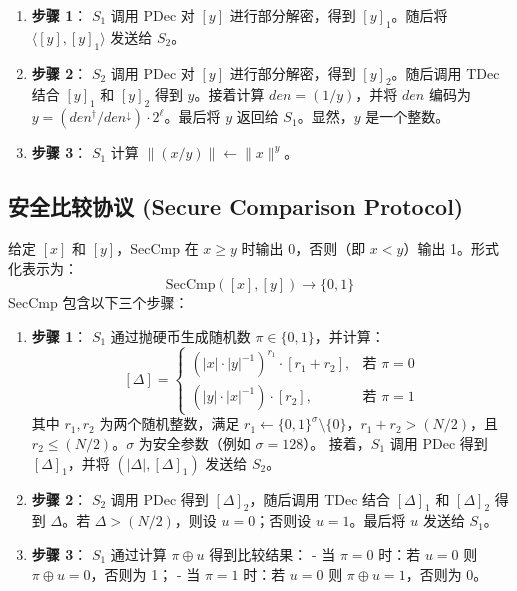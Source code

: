 \begin{enumerate}[leftmargin=*, nosep]
    \item \textbf{步骤 1}：  
    \(S_1\) 调用 PDec 对 \([y]\) 进行部分解密，得到 \([y]_1\)。随后将 \(\langle [y], [y]_1 \rangle\) 发送给 \(S_2\)。

    \item \textbf{步骤 2}：  
    \(S_2\) 调用 PDec 对 \([y]\) 进行部分解密，得到 \([y]_2\)。随后调用 TDec 结合 \([y]_1\) 和 \([y]_2\) 得到 \(y\)。接着计算 \(den = (1/y)\)，并将 \(den\) 编码为 \(y = (den^\dagger / den^\downarrow) \cdot 2^\ell\)。最后将 \(y\) 返回给 \(S_1\)。显然，\(y\) 是一个整数。

    \item \textbf{步骤 3}：  
    \(S_1\) 计算 \(\|(x/y)\| \leftarrow \|x\|^y\)。
\end{enumerate}

\subsection{安全比较协议 (Secure Comparison Protocol)}  
给定 \([x]\) 和 \([y]\)，SecCmp 在 \(x \geq y\) 时输出 0，否则（即 \(x < y\)）输出 1。形式化表示为：  
\[
\text{SecCmp}([x], [y]) \rightarrow \{0, 1\}
\]  
SecCmp 包含以下三个步骤：

\begin{enumerate}[leftmargin=*, nosep]
    \item \textbf{步骤 1}：  
    \(S_1\) 通过抛硬币生成随机数 \(\pi \in \{0, 1\}\)，并计算：
    \[
    [\Delta] = 
    \begin{cases} 
    (|x| \cdot |y|^{-1})^{r_1} \cdot [r_1 + r_2], & \text{若 } \pi = 0 \\ 
    (|y| \cdot |x|^{-1}) \cdot [r_2], & \text{若 } \pi = 1 
    \end{cases}
    \]
    其中 \(r_1, r_2\) 为两个随机整数，满足 \(r_1 \leftarrow \{0, 1\}^\sigma \setminus \{0\}\)，\(r_1 + r_2 > (N/2)\)，且 \(r_2 \leq (N/2)\)。\(\sigma\) 为安全参数（例如 \(\sigma = 128\)）。  
    接着，\(S_1\) 调用 PDec 得到 \([\Delta]_1\)，并将 \((|\Delta|, [\Delta]_1)\) 发送给 \(S_2\)。

    \item \textbf{步骤 2}：  
    \(S_2\) 调用 PDec 得到 \([\Delta]_2\)，随后调用 TDec 结合 \([\Delta]_1\) 和 \([\Delta]_2\) 得到 \(\Delta\)。若 \(\Delta > (N/2)\)，则设 \(u = 0\)；否则设 \(u = 1\)。最后将 \(u\) 发送给 \(S_1\)。

    \item \textbf{步骤 3}：  
    \(S_1\) 通过计算 \(\pi \oplus u\) 得到比较结果：  
    - 当 \(\pi = 0\) 时：若 \(u = 0\) 则 \(\pi \oplus u = 0\)，否则为 1；  
    - 当 \(\pi = 1\) 时：若 \(u = 0\) 则 \(\pi \oplus u = 1\)，否则为 0。
\end{enumerate}

